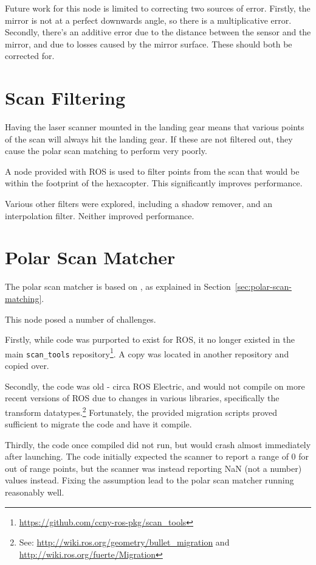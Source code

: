 \documentclass[12pt,oneside,a4paper,draft]{book}
\begin{document}
Future work for this node is limited to correcting two sources of
error.  Firstly, the mirror is not at a perfect downwards angle, so
there is a multiplicative error. Secondly, there's an additive error
due to the distance between the sensor and the mirror, and due to
losses caused by the mirror surface. These should both be corrected
for.

\section{Scan Filtering}
\label{sec:scan-filtering}

Having the laser scanner mounted in the landing gear means that
various points of the scan will always hit the landing gear. If these
are not filtered out, they cause the polar scan matching to perform
very poorly.

A node provided with ROS is used to filter points from the scan that
would be within the footprint of the hexacopter. This significantly
improves performance.

Various other filters were explored, including a shadow remover, and
an interpolation filter. Neither improved performance.

\section{Polar Scan Matcher}
\label{sec:polar-scan-matcher}

The polar scan matcher is based on \cite{polarscanmatching}, as
explained in Section~\ref{sec:polar-scan-matching}.

This node posed a number of challenges.

Firstly, while code was purported to exist for ROS, it no longer
existed in the main \texttt{scan\_tools}
repository\footnote{\url{https://github.com/ccny-ros-pkg/scan_tools}}. A
copy was located in another repository and copied over.

Secondly, the code was old - circa ROS Electric, and would not compile
on more recent versions of ROS due to changes in various libraries,
specifically the transform datatypes.\footnote{See:
  \url{http://wiki.ros.org/geometry/bullet_migration} and
  \url{http://wiki.ros.org/fuerte/Migration}} Fortunately, the
provided migration scripts proved sufficient to migrate the code and
have it compile.

Thirdly, the code once compiled did not run, but would crash almost
immediately after launching. The code initially expected the scanner
to report a range of 0 for out of range points, but the scanner was
instead reporting NaN (not a number) values instead. Fixing the
assumption lead to the polar scan matcher running reasonably well.
\end{document}

